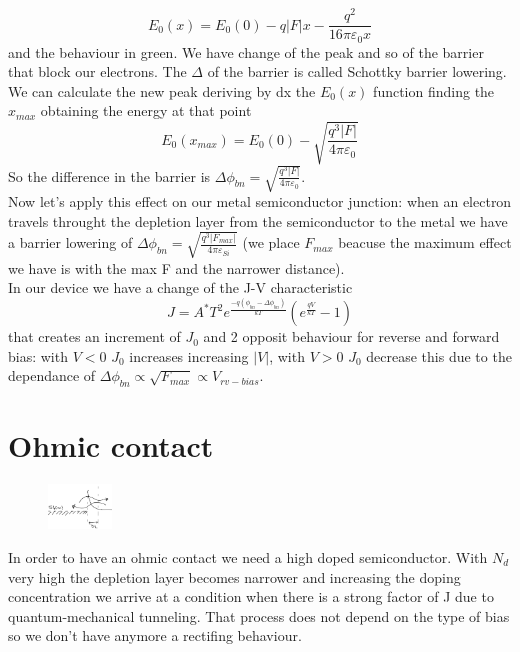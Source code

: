 \begin{equation}
E_0(x)=E_0(0)-q|F|x-\frac{q^2}{16 \pi \varepsilon_0 x}
\end{equation}
and the behaviour in green. We have change of the peak and so of the barrier that block our electrons. The $\Delta$ of the barrier is called Schottky barrier lowering.\\
We can calculate the new peak deriving by dx the $E_0(x)$ function finding the $x_{max}$ obtaining the energy at that point 
\begin{equation}
E_0(x_{max})=E_0(0)-\sqrt{\frac{q^3|F|}{4\pi \varepsilon_0}}
\end{equation}
So the difference in the barrier is $\Delta\phi_{bn}=\sqrt{\frac{q^3|F|}{4\pi \varepsilon_0}}$.\\
Now let's apply this effect on our metal semiconductor junction: when an electron travels throught the depletion layer from the semiconductor to the metal we have a barrier lowering of $\Delta\phi_{bn}=\sqrt{\frac{q^3|F_{max}|}{4\pi \varepsilon_{Si}}}$ (we place $F_{max}$ beacuse the maximum effect we have is with the max F and the narrower distance).\\
In our device we have a change of the J-V characteristic 
\begin{equation}
J=A^*T^2e^{\frac{-q(\phi_{bn}-\Delta\phi_{bn})}{kT}}(e^{\frac{qV}{kT}}-1)
\end{equation}
that creates an increment of $J_0$ and 2 opposit behaviour for reverse and forward bias: with $V<0$ $J_0$ increases increasing $|V|$, with $V>0$ $J_0$ decrease this due to the dependance of $\Delta\phi_{bn}\propto\sqrt{F_{max}}\propto V_{rv-bias}$.\\
\section{Ohmic contact}
\begin{figure}
\includegraphics[width=0.15\textwidth]{tunnel.png}
\end{figure}

In order to have an ohmic contact we need a high doped semiconductor. With $N_d$ very high the depletion layer becomes narrower and increasing the doping concentration we arrive at a condition when there is a strong factor of J due to quantum-mechanical tunneling. That process does not depend on the type of bias so we don't have anymore a rectifing behaviour.\\

